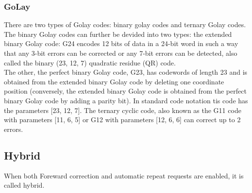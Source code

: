 \subsubsection{GoLay}
There are two types of Golay codes: binary golay codes and ternary Golay codes. \\
The binary Golay codes can further be devided into two types: the extended binary Golay code: G24 encodes 12 bits of data in a 24-bit word in such a way that any 3-bit errors can be corrected or any 7-bit errors can be detected, also called the binary (23, 12, 7) quadratic residue (QR) code.\\
The other, the perfect binary Golay code, G23, has codewords of length 23 and is obtained from the extended binary Golay code by deleting one coordinate position (conversely, the extended binary Golay code is obtained from the perfect binary Golay code by adding a parity bit). In standard code notation tis code has the parameters [23, 12, 7].
The ternary cyclic code, also known as the G11 code with parameters [11, 6, 5] or G12 with parameters [12, 6, 6] can correct up to 2 errors.
%
%
\subsection{Hybrid}
When both Foreward correction and automatic repeat requests are enabled, it is called hybrid. \cite{TestID}